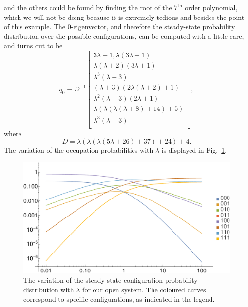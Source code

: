and the others could be found by finding the root of the $7^\mathrm{th}$ order polynomial, which we
will not be doing because it is extremely tedious and besides the point of this example. The
$0$-eigenvector, and therefore the steady-state probability distribution over the possible
configurations, can be computed with a little care, and turns out to be
\begin{equation}
 q_0 = D^{-1}
 \begin{bmatrix}
  3 \lambda +1,\lambda  (3 \lambda +1) \\
  \lambda  (\lambda +2) (3 \lambda +1) \\
  \lambda ^3 (\lambda +3) \\
  (\lambda +3) (2 \lambda  (\lambda +2)+1) \\
  \lambda ^2 (\lambda +3) (2 \lambda +1) \\
  \lambda  (\lambda  (\lambda (\lambda +8)+14)+5) \\
  \lambda ^3 (\lambda +3) \\
 \end{bmatrix},
\end{equation}
where
\begin{equation}
 D = \lambda  (\lambda  (\lambda  (5 \lambda +26)+37)+24)+4.
\end{equation}
The variation of the occupation probabilities with $\lambda$ is displayed in
Fig.~\ref{fig:smallOccProbs}.
 \begin{figure}[h!]
 \caption[The variation of configuration probabilities with $\lambda$ for a small open system.]{\label{fig:smallOccProbs} 
 The variation of the steady-state configuration probability distribution with $\lambda$ for our
 open system. The coloured curves correspond to specific configurations, as indicated in the legend.
 }
  \begin{center}
 \includegraphics[width=1.0\textwidth]{TRM/images/smallOpenOcc}
  \end{center}
\end{figure}
